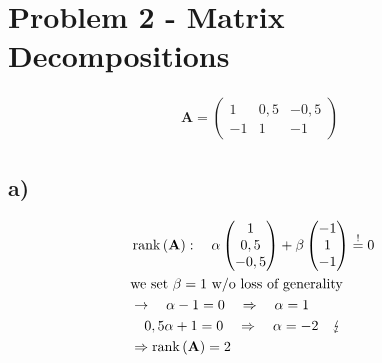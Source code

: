 \section*{Problem 2 - Matrix Decompositions}
\begin{align*}
	\mathbf{A}=
	\begin{pmatrix}
	1 & 0,5 & -0,5 \\
	-1 & 1 & -1
	\end{pmatrix}
\end{align*}

\subsection*{a)}
\begin{align*}
	&\operatorname{rank}\left(\mathbf{A}\right):\quad\alpha\begin{pmatrix}1\\0,5\\-0,5\end{pmatrix}+\beta\begin{pmatrix}-1\\1\\-1\end{pmatrix}\overset{!}{=}0& \\
	&\text{we set $\beta=1$ w/o loss of generality}& \\
	&\rightarrow\quad\alpha-1=0\quad\Rightarrow\quad\alpha=1& \\
	&\quad 0,5\alpha+1=0\quad\Rightarrow\quad\alpha=-2\quad\lightning& \\
	&\Rightarrow\operatorname{rank}\left(\mathbf{A}\right)=2&
\end{align*}

